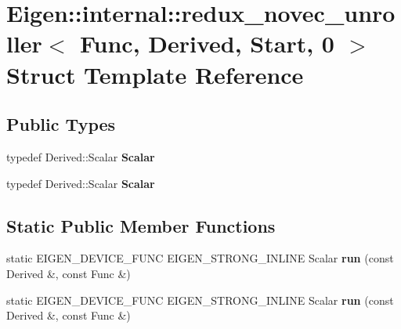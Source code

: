 \hypertarget{struct_eigen_1_1internal_1_1redux__novec__unroller_3_01_func_00_01_derived_00_01_start_00_010_01_4}{}\section{Eigen\+:\+:internal\+:\+:redux\+\_\+novec\+\_\+unroller$<$ Func, Derived, Start, 0 $>$ Struct Template Reference}
\label{struct_eigen_1_1internal_1_1redux__novec__unroller_3_01_func_00_01_derived_00_01_start_00_010_01_4}
\subsection*{Public Types}
\begin{DoxyCompactItemize}
\item 
\mbox{\label{struct_eigen_1_1internal_1_1redux__novec__unroller_3_01_func_00_01_derived_00_01_start_00_010_01_4_ad1af54e129a6f11fc04d3a06ae09a460}} 
typedef Derived\+::\+Scalar {\bfseries Scalar}
\item 
\mbox{\label{struct_eigen_1_1internal_1_1redux__novec__unroller_3_01_func_00_01_derived_00_01_start_00_010_01_4_ad1af54e129a6f11fc04d3a06ae09a460}} 
typedef Derived\+::\+Scalar {\bfseries Scalar}
\end{DoxyCompactItemize}
\subsection*{Static Public Member Functions}
\begin{DoxyCompactItemize}
\item 
\mbox{\label{struct_eigen_1_1internal_1_1redux__novec__unroller_3_01_func_00_01_derived_00_01_start_00_010_01_4_ad18dab49dd99ec887429bc454edcb05f}} 
static E\+I\+G\+E\+N\+\_\+\+D\+E\+V\+I\+C\+E\+\_\+\+F\+U\+NC E\+I\+G\+E\+N\+\_\+\+S\+T\+R\+O\+N\+G\+\_\+\+I\+N\+L\+I\+NE Scalar {\bfseries run} (const Derived \&, const Func \&)
\item 
\mbox{\label{struct_eigen_1_1internal_1_1redux__novec__unroller_3_01_func_00_01_derived_00_01_start_00_010_01_4_ad18dab49dd99ec887429bc454edcb05f}} 
static E\+I\+G\+E\+N\+\_\+\+D\+E\+V\+I\+C\+E\+\_\+\+F\+U\+NC E\+I\+G\+E\+N\+\_\+\+S\+T\+R\+O\+N\+G\+\_\+\+I\+N\+L\+I\+NE Scalar {\bfseries run} (const Derived \&, const Func \&)
\end{DoxyCompactItemize}


